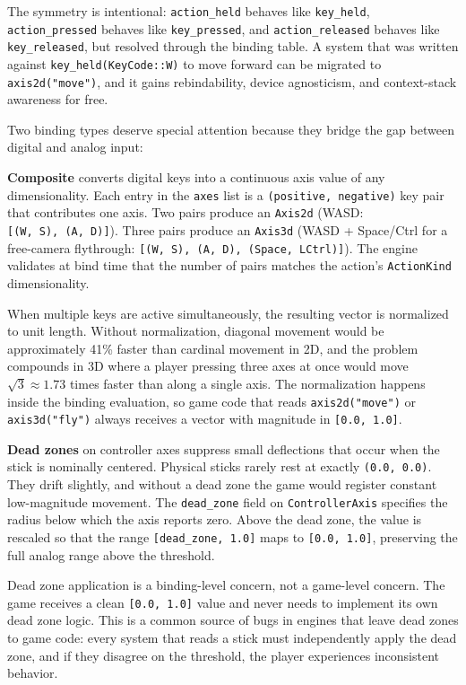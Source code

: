 \documentclass[
  11pt,
  letterpaper,
  DIV=11,
  numbers=noendperiod,
  twoside,
  open=right]{scrreprt}
\begin{document}
The symmetry is intentional: \texttt{action\_held} behaves like
\texttt{key\_held}, \texttt{action\_pressed} behaves like
\texttt{key\_pressed}, and \texttt{action\_released} behaves like
\texttt{key\_released}, but resolved through the binding table. A system
that was written against \texttt{key\_held(KeyCode::W)} to move forward
can be migrated to \texttt{axis2d("move")}, and it gains rebindability,
device agnosticism, and context-stack awareness for free.

Two binding types deserve special attention because they bridge the gap
between digital and analog input:

\textbf{Composite} converts digital keys into a continuous axis value of
any dimensionality. Each entry in the \texttt{axes} list is a
\texttt{(positive,\ negative)} key pair that contributes one axis. Two
pairs produce an \texttt{Axis2d} (WASD:
\texttt{{[}(W,\ S),\ (A,\ D){]}}). Three pairs produce an
\texttt{Axis3d} (WASD + Space/Ctrl for a free-camera flythrough:
\texttt{{[}(W,\ S),\ (A,\ D),\ (Space,\ LCtrl){]}}). The engine
validates at bind time that the number of pairs matches the action's
\texttt{ActionKind} dimensionality.

When multiple keys are active simultaneously, the resulting vector is
normalized to unit length. Without normalization, diagonal movement
would be approximately 41\% faster than cardinal movement in 2D, and the
problem compounds in 3D where a player pressing three axes at once would
move \(\sqrt{3} \approx 1.73\) times faster than along a single axis.
The normalization happens inside the binding evaluation, so game code
that reads \texttt{axis2d("move")} or \texttt{axis3d("fly")} always
receives a vector with magnitude in \texttt{{[}0.0,\ 1.0{]}}.

\textbf{Dead zones} on controller axes suppress small deflections that
occur when the stick is nominally centered. Physical sticks rarely rest
at exactly \texttt{(0.0,\ 0.0)}. They drift slightly, and without a dead
zone the game would register constant low-magnitude movement. The
\texttt{dead\_zone} field on \texttt{ControllerAxis} specifies the
radius below which the axis reports zero. Above the dead zone, the value
is rescaled so that the range \texttt{{[}dead\_zone,\ 1.0{]}} maps to
\texttt{{[}0.0,\ 1.0{]}}, preserving the full analog range above the
threshold.

Dead zone application is a binding-level concern, not a game-level
concern. The game receives a clean \texttt{{[}0.0,\ 1.0{]}} value and
never needs to implement its own dead zone logic. This is a common
source of bugs in engines that leave dead zones to game code: every
system that reads a stick must independently apply the dead zone, and if
they disagree on the threshold, the player experiences inconsistent
behavior.
\end{document}
